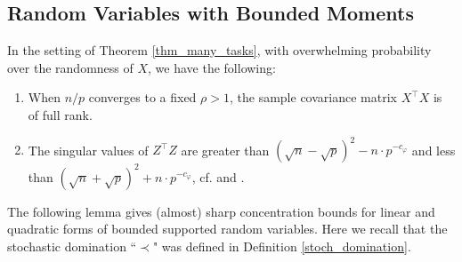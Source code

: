 \subsection{Random Variables with Bounded Moments}

\begin{fact}\label{fact_minv}
	In the setting of Theorem \ref{thm_many_tasks}, with overwhelming probability over the randomness of $X$, we have the following:
	\begin{enumerate}
		\item When $n / p$ converges to a fixed $\rho > 1$, the sample covariance matrix ${X^{\top}X} $ is of full rank.
		\item The singular values of $Z^{\top}Z$ are greater than $(\sqrt{n} - \sqrt{p})^2 - n \cdot p^{-c_{\varphi}}$ and less than $(\sqrt{n} + \sqrt{p})^2 + n \cdot p^{-c_{\varphi}}$, cf. \citet[Theorem 2.10]{isotropic} and \citet[Lemma 3.12]{DY}.
	\end{enumerate}
\end{fact}

The following lemma gives (almost) sharp concentration bounds for linear and quadratic forms of bounded supported random variables. Here we recall that the stochastic domination ``$\prec$" was defined in Definition \ref{stoch_domination}.

